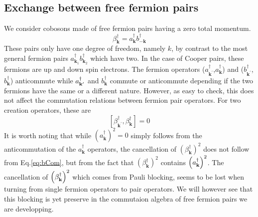 \documentclass[aps,prb,superscriptaddress,twocolumn]{revtex4}
\newcommand{\vk}{\ensuremath{\mathbf{k}}}
\begin{document}
\subsection{Exchange between free fermion pairs}

We consider cobosons made of free fermion pairs having a zero total
momentum. 
\begin{equation}
\beta^{\dagger}_\vk=a^{\dagger}_{\mathbf{k} }b^{\dagger}_{-\mathbf{k} }
\end{equation}
These pairs only have one degree of freedom, namely $k$, by contrast to the
most general fermion pairs $a^{\dagger}_{\mathbf{k} _1}b^{\dagger}_{\mathbf{k%
} _2}$ which have two. In the case of Cooper pairs, these fermions are up
and down spin electrons. The fermion operators ($a^{\dagger}_{\mathbf{k}
^{\prime}}$,$a^{\dagger}_{\mathbf{k} }$) and ($b^{\dagger}_{\mathbf{k}
^{\prime}}$,$b^{\dagger}_{\mathbf{k} }$) anticommute while $a^{\dagger}_{%
\mathbf{k} ^{\prime}}$ and $b^{\dagger}_{\mathbf{k} }$ commute or
anticommute depending if the two fermions have the same or a different
nature. However, as easy to check, this does not affect the commutation
relations between fermion pair operators. For two creation operators, these
are 
\begin{equation}  \label{eq:bCom}
\left[\beta^{\dagger}_{\mathbf{k} ^{\prime}},\beta^{\dagger}_{\mathbf{k} }%
\right]  =0
\end{equation}
It is worth noting that while $\left(a^{\dagger}_{\mathbf{k} }\right) ^2=0$
simply follows from the anticommutation of the $a^{\dagger}_{\mathbf{k} }$
operators, the cancellation of $\left(\beta^{\dagger}_{\mathbf{k} }\right) ^2
$ does not follow from Eq.\eqref{eq:bCom}, but from the fact that $%
\left(\beta^{\dagger}_{\mathbf{k} }\right) ^2$ contains $\left(a^{\dagger}_{%
\mathbf{k} {}}\right) ^2$. The cancellation of $\left(\beta^{\dagger}_{%
\mathbf{k} }\right) ^2$ which comes from Pauli blocking, seems to be lost
when turning from single fermion operators to pair operators. We will
however see that this blocking is yet preserve in the commutaion algebra of
free fermion pairs we are developping.
\end{document}
